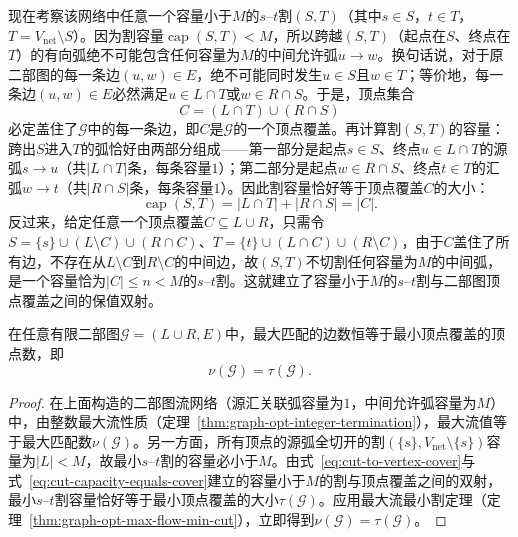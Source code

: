现在考察该网络中任意一个容量小于$M$的$s$--$t$割$(S,T)$（其中$s\in S$，$t\in T$，$T=V_{\text{net}}\setminus S$）。因为割容量$\operatorname{cap}(S,T)<M$，所以跨越$(S,T)$（起点在$S$、终点在$T$）的有向弧绝不可能包含任何容量为$M$的中间允许弧$u\to w$。换句话说，对于原二部图的每一条边$(u,w)\in E$，绝不可能同时发生$u\in S$且$w\in T$；等价地，每一条边$(u,w)\in E$必然满足$u\in L\cap T$或$w\in R\cap S$。于是，顶点集合
\begin{equation}
  C = (L\cap T)\cup(R\cap S)
  \label{eq:cut-to-vertex-cover}
\end{equation}
必定盖住了$\mathcal G$中的每一条边，即$C$是$\mathcal G$的一个顶点覆盖。再计算割$(S,T)$的容量：跨出$S$进入$T$的弧恰好由两部分组成——第一部分是起点$s\in S$、终点$u\in L\cap T$的源弧$s\to u$（共$|L\cap T|$条，每条容量$1$）；第二部分是起点$w\in R\cap S$、终点$t\in T$的汇弧$w\to t$（共$|R\cap S|$条，每条容量$1$）。因此割容量恰好等于顶点覆盖$C$的大小：
\begin{equation}
  \operatorname{cap}(S,T) = |L\cap T| + |R\cap S| = |C|.
  \label{eq:cut-capacity-equals-cover}
\end{equation}
反过来，给定任意一个顶点覆盖$C\subseteq L\cup R$，只需令$S=\{s\}\cup(L\setminus C)\cup(R\cap C)$、$T=\{t\}\cup(L\cap C)\cup(R\setminus C)$，由于$C$盖住了所有边，不存在从$L\setminus C$到$R\setminus C$的中间边，故$(S,T)$不切割任何容量为$M$的中间弧，是一个容量恰为$|C|\leq n<M$的$s$--$t$割。这就建立了容量小于$M$的$s$--$t$割与二部图顶点覆盖之间的保值双射。

\begin{theorem}[König定理]
\label{thm:konig-bipartite}
在任意有限二部图$\mathcal G=(L\cup R,E)$中，最大匹配的边数恒等于最小顶点覆盖的顶点数，即
\begin{equation}
  \nu(\mathcal G) = \tau(\mathcal G).
  \label{eq:konig-theorem}
\end{equation}
\end{theorem}

\begin{proof}
在上面构造的二部图流网络（源汇关联弧容量为$1$，中间允许弧容量为$M$）中，由整数最大流性质（定理~\ref{thm:graph-opt-integer-termination}），最大流值等于最大匹配数$\nu(\mathcal G)$。另一方面，所有顶点的源弧全切开的割$(\{s\},V_{\text{net}}\setminus\{s\})$容量为$|L|<M$，故最小$s$--$t$割的容量必小于$M$。由式~\eqref{eq:cut-to-vertex-cover}与式~\eqref{eq:cut-capacity-equals-cover}建立的容量小于$M$的割与顶点覆盖之间的双射，最小$s$--$t$割容量恰好等于最小顶点覆盖的大小$\tau(\mathcal G)$。应用最大流最小割定理（定理~\ref{thm:graph-opt-max-flow-min-cut}），立即得到$\nu(\mathcal G)=\tau(\mathcal G)$。
\end{proof}

